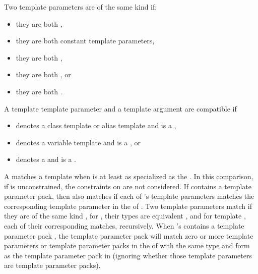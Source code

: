 \documentclass{wg21}
\begin{document}
\begin{addedblock}
Two template parameters are of the same kind if:
\begin{itemize}
\item they are both ,
\item they are both constant template parameters,
\item they are both ,
\item they are both , or
\item they are both .
\end{itemize}

A template template parameter  and a template argument  are compatible if
\begin{itemize}
\item {} denotes a class template or alias template and  is a ,
\item {} denotes a variable template and  is a , or
\item {} denotes a  and  is a .
\end{itemize}
\end{addedblock}


\pnum
A  matches a template
  when 
 is at least as specialized as the  .
In this comparison, if  is unconstrained,
the constraints on  are not considered.
If  contains a template parameter pack, then  also matches 
if each of 's template parameters
matches the corresponding template parameter in the
 of .
Two template parameters match if they are of the same kind ,
for  , their types are
equivalent , and for template ,
each of their corresponding  matches, recursively.
When 's  contains a template parameter
pack , the template parameter pack will match zero or more template
parameters or template parameter packs in the  of
 with the same type and form as the template parameter pack in 
(ignoring whether those template parameters are template parameter packs).
\end{document}
